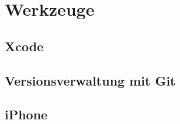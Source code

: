\chapter{Werkzeuge}
\label{chap:tools}


\section{Xcode}
\label{sec:tools:xcode}

\section{Versionsverwaltung mit Git}
\label{sec:tools:git}

\section{iPhone}
\label{sec:tools:iphone}
